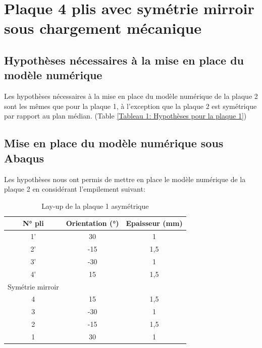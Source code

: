 \documentclass[a4paper,12pt]{article}
\begin{document}

\section{Plaque 4 plis avec symétrie mirroir sous chargement mécanique}
\subsection{Hypothèses nécessaires à la mise en place du modèle numérique}
Les hypothèses nécessaires à la mise en place du modèle numérique de la plaque 2 sont les mêmes que pour la plaque 1, à l'exception que la plaque 2 est symétrique par rapport au plan médian.
(Table \ref{Tableau 1: Hypothèses pour la plaque 1})

\subsection{Mise en place du modèle numérique sous Abaqus}
Les hypothèses nous ont permis de mettre en place le modèle numérique de la plaque 2 en considérant l'empilement suivant:

\begin{table}[h!]
	\renewcommand{\arraystretch}{1.2} %
	\centering
	\begin{tabular}{c|c|c}
		\textbf{N° pli} & \textbf{Orientation (°)} & \textbf{Epaisseur (mm)} \\
		\hline
		1'         & 30             & 1           \\
		2'          & -15              & 1,5           \\
		3'          & -30              & 1            \\
		4'         & 15              & 1,5            \\
		\hline
		Symétrie mirroir \\
		\hline
		4         & 15              & 1,5            \\
		3          & -30              & 1            \\
		2          & -15              & 1,5           \\
		1         & 30             & 1           \\
	\end{tabular}
	\caption{Lay-up de la plaque 1 asymétrique}
	\label{tab:exemple_tableau}
\end{table}
\end{document}
